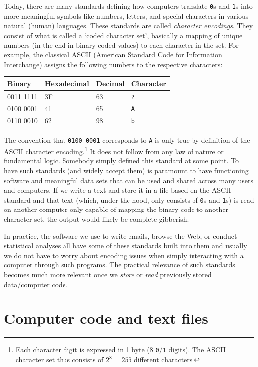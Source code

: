 \documentclass[
  12pt,
]{style/krantz}
\begin{document}
Today, there are many standards defining how computers translate \texttt{0}s and \texttt{1}s into more meaningful symbols like numbers, letters, and special characters in various natural (human) languages. These standards are called \emph{character encodings}. They consist of what is called a `coded character set', basically a mapping of unique numbers (in the end in binary coded values) to each character in the set. For example, the classical ASCII (American Standard Code for Information Interchange) assigns the following numbers to the respective characters:

\begin{longtable}[]{@{}llll@{}}
\toprule
Binary & Hexadecimal & Decimal & Character \\
\midrule
\endhead
0011 1111 & 3F & 63 & \texttt{?} \\
0100 0001 & 41 & 65 & \texttt{A} \\
0110 0010 & 62 & 98 & \texttt{b} \\
\bottomrule
\end{longtable}

The convention that \texttt{0100\ 0001} corresponds to \texttt{A} is only true by definition of the ASCII character encoding.\footnote{Each character digit is expressed in 1 byte (8 \texttt{0}/\texttt{1} digits). The ASCII character set thus consists of \(2^{8}=256\) different characters.} It does not follow from any law of nature or fundamental logic. Somebody simply defined this standard at some point. To have such standards (and widely accept them) is paramount to have functioning software and meaningful data sets that can be used and shared across many users and computers. If we write a text and store it in a file based on the ASCII standard and that text (which, under the hood, only consists of \texttt{0}s and \texttt{1}s) is read on another computer only capable of mapping the binary code to another character set, the output would likely be complete gibberish.

In practice, the software we use to write emails, browse the Web, or conduct statistical analyses all have some of these standards built into them and usually we do not have to worry about encoding issues when simply interacting with a computer through such programs. The practical relevance of such standards becomes much more relevant once we \emph{store} or \emph{read} previously stored data/computer code.

\hypertarget{computer-code-and-text-files}{%
\section{Computer code and text files}\label{computer-code-and-text-files}}
\end{document}

